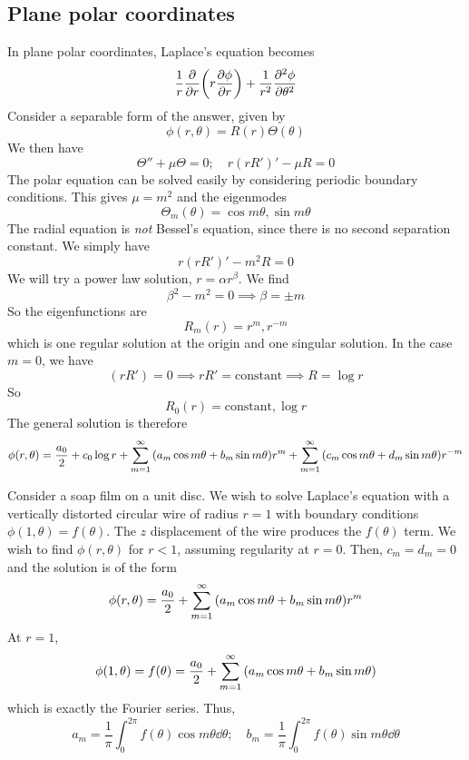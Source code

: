 \subsection{Plane polar coordinates}
In plane polar coordinates, Laplace's equation becomes
\[ \frac{1}{r} \pdv{r} \qty(r \pdv{\phi}{r}) + \frac{1}{r^2} \pdv[2]{\phi}{\theta} \]
Consider a separable form of the answer, given by
\[ \phi(r,\theta) = R(r) \Theta(\theta) \]
We then have
\[ \Theta'' + \mu \Theta = 0;\quad r(rR')' - \mu R = 0 \]
The polar equation can be solved easily by considering periodic boundary conditions.
This gives \( \mu = m^2 \) and the eigenmodes
\[ \Theta_m(\theta) = \cos m \theta, \sin m \theta \]
The radial equation is \textit{not} Bessel's equation, since there is no second separation constant.
We simply have
\[ r(rR')' - m^2 R = 0 \]
We will try a power law solution, \( r = \alpha r^\beta \).
We find
\[ \beta^2 - m^2 = 0 \implies \beta = \pm m \]
So the eigenfunctions are
\[ R_m(r) = r^m, r^{-m} \]
which is one regular solution at the origin and one singular solution.
In the case \( m = 0 \), we have
\[ (rR') = 0 \implies rR' = \text{constant} \implies R = \log r \]
So
\[ R_0(r) = \text{constant}, \log r \]
The general solution is therefore
\[ \phi(r,\theta) = \frac{a_0}{2} + c_0 \log r + \sum_{m=1}^\infty \qty(a_m \cos m\theta + b_m \sin m\theta) r^m + \sum_{m=1}^\infty \qty(c_m \cos m\theta + d_m \sin m\theta) r^{-m} \]
\begin{example}
    Consider a soap film on a unit disc.
    We wish to solve Laplace's equation with a vertically distorted circular wire of radius \( r = 1 \) with boundary conditions \( \phi(1, \theta) = f(\theta) \).
    The \( z \) displacement of the wire produces the \( f(\theta) \) term.
    We wish to find \( \phi(r,\theta) \) for \( r < 1 \), assuming regularity at \( r = 0 \).
    Then, \( c_m = d_m = 0 \) and the solution is of the form
    \[ \phi(r,\theta) = \frac{a_0}{2} + \sum_{m=1}^\infty \qty(a_m \cos m\theta + b_m \sin m\theta) r^m \]
    At \( r = 1 \),
    \[ \phi(1,\theta) = f(\theta) = \frac{a_0}{2} + \sum_{m=1}^\infty \qty(a_m \cos m\theta + b_m \sin m\theta) \]
    which is exactly the Fourier series.
    Thus,
    \[ a_m = \frac{1}{\pi} \int_0^{2\pi} f(\theta) \cos m \theta \dd{\theta};\quad b_m = \frac{1}{\pi} \int_0^{2\pi} f(\theta) \sin m \theta \dd{\theta} \]
\end{example}
